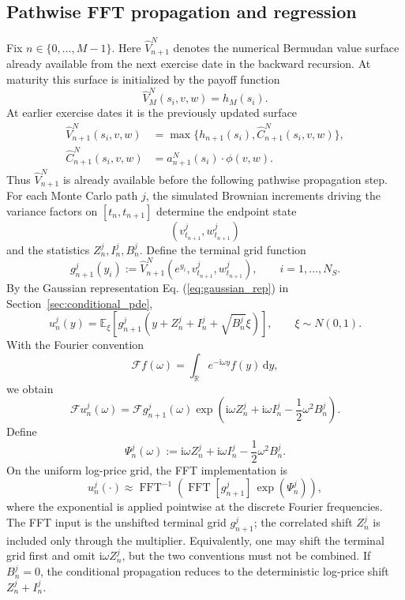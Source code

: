 \documentclass[pdflatex,sn-mathphys-num]{sn-jnl}
\theoremstyle{thmstyleone}%
\theoremstyle{thmstylethree}%
\theoremstyle{thmstyletwo}%
\newcommand{\dd}{\mathrm d}
\newcommand{\E}{\mathbb E}
\newcommand{\R}{\mathbb R}
\begin{document}
\subsection{Pathwise FFT propagation and regression}
Fix $n\in\{0,\ldots,M-1\}$. Here $\widehat V_{n+1}^N$ denotes the numerical
Bermudan value surface already available from the next exercise date in the
backward recursion. At maturity this surface is initialized by the payoff function
$$
\widehat V_M^N(s_i,v,w)=h_M(s_i).
$$
At earlier exercise dates it is the previously updated surface
$$
\begin{aligned}
\widehat V_{n+1}^N(s_i,v,w)
&=
\max\{h_{n+1}(s_i),\widehat C_{n+1}^N(s_i,v,w)\},\\
\widehat C_{n+1}^N(s_i,v,w)
&=
a_{n+1}^N(s_i)\cdot\phi(v,w).
\end{aligned}
$$
Thus $\widehat V_{n+1}^N$ is already available before the following pathwise
propagation step. For each Monte Carlo path $j$, the simulated Brownian
increments driving the variance factors on $[t_n,t_{n+1}]$ determine the
endpoint state
$$
(v_{t_{n+1}}^j,w_{t_{n+1}}^j)
$$
and the statistics $Z_n^j,I_n^j,B_n^j$. Define the terminal grid function
$$
g_{n+1}^j(y_i)
:=
\widehat V_{n+1}^N
\left(e^{y_i},v_{t_{n+1}}^j,w_{t_{n+1}}^j\right),
\qquad i=1,\ldots,N_S.
$$
By the Gaussian representation Eq. (\ref{eq:gaussian_rep}) in Section~\ref{sec:conditional_pde},
$$
u_n^j(y)
=
\E_\xi\!\left[
g_{n+1}^j
\left(
y+Z_n^j+I_n^j+\sqrt{B_n^j}\xi
\right)
\right],
\qquad \xi\sim N(0,1).
$$
With the Fourier convention
$$
\mathcal F f(\omega)
=
\int_{\R}e^{-\mathrm i\omega y}f(y)\,\dd y,
$$
we obtain
$$
\mathcal F u_n^j(\omega)
=
\mathcal F g_{n+1}^j(\omega)
\exp\left(
\mathrm i\omega Z_n^j+\mathrm i\omega I_n^j-\frac12\omega^2B_n^j
\right).
$$
Define
$$
\Psi_n^j(\omega)
:=
\mathrm i\omega Z_n^j+\mathrm i\omega I_n^j-\frac12\omega^2B_n^j.
$$
On the uniform log-price grid, the FFT implementation is
\begin{equation}
u_n^j(\cdot)
\approx
\operatorname{FFT}^{-1}
\left(
\operatorname{FFT}[g_{n+1}^j]\,
\exp(\Psi_n^j)
\right),
\label{eq:fft-recursion}
\end{equation}
where the exponential is applied pointwise at the discrete Fourier frequencies.
The FFT input is the unshifted terminal grid $g_{n+1}^j$; the correlated shift
$Z_n^j$ is included only through the multiplier. Equivalently, one may shift the
terminal grid first and omit $\mathrm i\omega Z_n^j$, but the two conventions
must not be combined. If $B_n^j=0$, the conditional propagation reduces to the
deterministic log-price shift $Z_n^j+I_n^j$.
\end{document}
